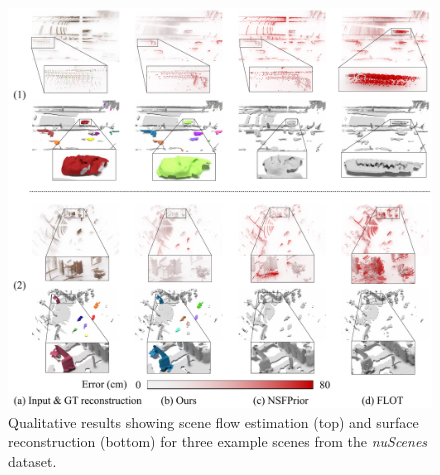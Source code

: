 \begin{figure}[t]
     \centering
        \includegraphics[width=\columnwidth]{figs/figure/supp_nuscene.pdf}
       \caption{Qualitative results showing scene flow estimation (top) and surface reconstruction (bottom) for three example scenes from the \emph{nuScenes} dataset.}
   \label{fig:supp_nuscene}
\end{figure}